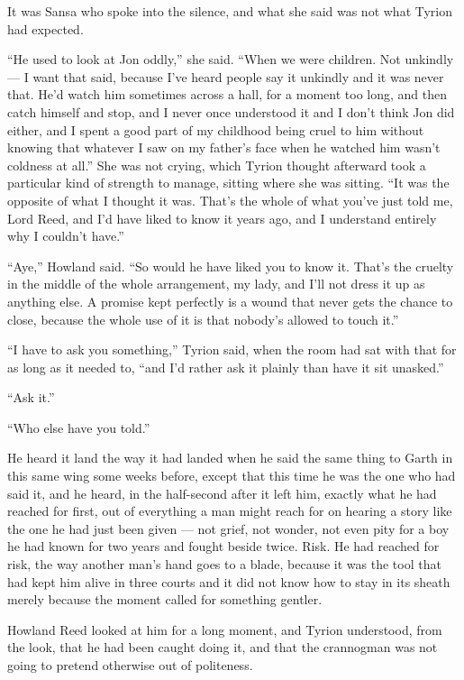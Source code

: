 It was Sansa who spoke into the silence, and what she said was not what Tyrion had expected.

“He used to look at Jon oddly,” she said. “When we were children. Not unkindly — I want that said, because I’ve heard people say it unkindly and it was never that. He’d watch him sometimes across a hall, for a moment too long, and then catch himself and stop, and I never once understood it and I don’t think Jon did either, and I spent a good part of my childhood being cruel to him without knowing that whatever I saw on my father’s face when he watched him wasn’t coldness at all.” She was not crying, which Tyrion thought afterward took a particular kind of strength to manage, sitting where she was sitting. “It was the opposite of what I thought it was. That’s the whole of what you’ve just told me, Lord Reed, and I’d have liked to know it years ago, and I understand entirely why I couldn’t have.”

“Aye,” Howland said. “So would he have liked you to know it. That’s the cruelty in the middle of the whole arrangement, my lady, and I’ll not dress it up as anything else. A promise kept perfectly is a wound that never gets the chance to close, because the whole use of it is that nobody’s allowed to touch it.”

\sceneBreak

“I have to ask you something,” Tyrion said, when the room had sat with that for as long as it needed to, “and I’d rather ask it plainly than have it sit unasked.”

“Ask it.”

“Who else have you told.”

He heard it land the way it had landed when he said the same thing to Garth in this same wing some weeks before, except that this time he was the one who had said it, and he heard, in the half-second after it left him, exactly what he had reached for first, out of everything a man might reach for on hearing a story like the one he had just been given — not grief, not wonder, not even pity for a boy he had known for two years and fought beside twice. Risk. He had reached for risk, the way another man’s hand goes to a blade, because it was the tool that had kept him alive in three courts and it did not know how to stay in its sheath merely because the moment called for something gentler.

Howland Reed looked at him for a long moment, and Tyrion understood, from the look, that he had been caught doing it, and that the crannogman was not going to pretend otherwise out of politeness.

